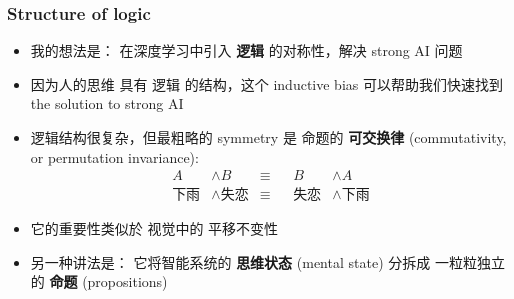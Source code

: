 \documentclass[16pt]{beamer}
\newcommand{\cc}[2]{#1}
\newcommand{\cc}[2]{#2}
\newcommand{\emp}[1]{\textbf{\color{violet}#1}}
\begin{document}
\begin{frame}
\frametitle{Structure of logic}
\begin{itemize}
	\item \cc{
	我的想法是： 在深度学习中引入 \emp{逻辑} 的对称性，解决 strong AI 问题}{
	The idea is:  introduce symmetries of \textbf{logic} into deep learning to solve the AGI problem
	}
	\item \cc{
	因为人的思维 具有 逻辑 的结构，这个 inductive bias 可以帮助我们快速找到 the solution to strong AI}{
	Because human cognition has logical structure, this inductive bias may help us find a solution to AGI faster
	}
	\item \cc{
	逻辑结构很复杂，但最粗略的 symmetry 是 命题的 \emp{可交换律} (commutativity, or permutation invariance):}{
	Logic is a complicated structure, but its simplest symmetry is the \textbf{commutativity} (or permutation invariance) of \textbf{propositions}:
	}
	\begin{equation}
	\begin{aligned}
	A &\wedge B & \equiv && B & \wedge A \\
	\mbox{\cc{下雨}{it's raining}} &\wedge \mbox{\cc{失恋}{lovesick}} & \equiv && \mbox{\cc{失恋}{lovesick}} &\wedge \mbox{\cc{下雨}{it's raining}}
	\end{aligned}
	\end{equation}
	\item \cc{
	它的重要性类似於 视觉中的 平移不变性}{
	Its importance may be analogous to translation invariance in vision
	}
	\item \cc{
	另一种讲法是： 它将智能系统的 \emp{思维状态} (mental state) 分拆成 一粒粒独立的 \emp{命题} (propositions)}{
	The significance of commutativity is:  it \textbf{decomposes} the AI system's \emp{mental state} into individual \emp{propositions}
	}
\end{itemize}
\end{frame}
\end{document}
